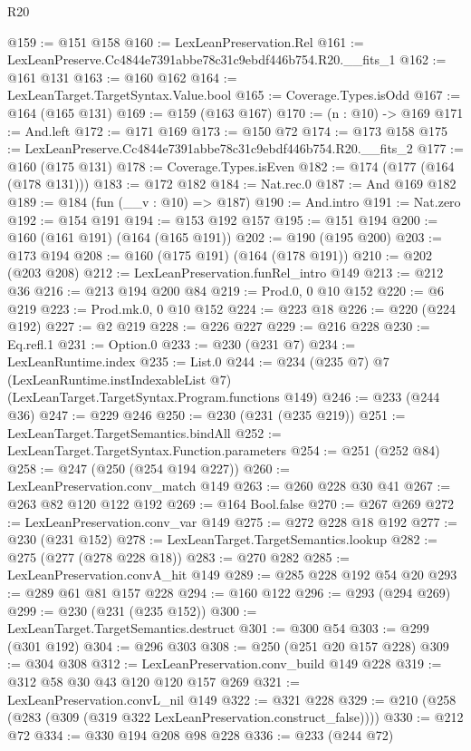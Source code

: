 \begin{lexlean}{R20}
\begin{coremodule}
@159 := @151 @158
@160 := LexLeanPreservation.Rel
@161 := LexLeanPreserve.Cc4844e7391abbe78c31c9ebdf446b754.R20.__fits_1
@162 := @161 @131
@163 := @160 @162
@164 := LexLeanTarget.TargetSyntax.Value.bool
@165 := Coverage.Types.isOdd
@167 := @164 (@165 @131)
@169 := @159 (@163 @167)
@170 := (n : @10) -> @169
@171 := And.left
@172 := @171 @169
@173 := @150 @72
@174 := @173 @158
@175 := LexLeanPreserve.Cc4844e7391abbe78c31c9ebdf446b754.R20.__fits_2
@177 := @160 (@175 @131)
@178 := Coverage.Types.isEven
@182 := @174 (@177 (@164 (@178 @131)))
@183 := @172 @182
@184 := Nat.rec.{0}
@187 := And @169 @182
@189 := @184 (fun (__v : @10) => @187)
@190 := And.intro
@191 := Nat.zero
@192 := @154 @191
@194 := @153 @192 @157
@195 := @151 @194
@200 := @160 (@161 @191) (@164 (@165 @191))
@202 := @190 (@195 @200)
@203 := @173 @194
@208 := @160 (@175 @191) (@164 (@178 @191))
@210 := @202 (@203 @208)
@212 := LexLeanPreservation.funRel_intro @149
@213 := @212 @36
@216 := @213 @194 @200 @84
@219 := Prod.{0, 0} @10 @152
@220 := @6 @219
@223 := Prod.mk.{0, 0} @10 @152
@224 := @223 @18
@226 := @220 (@224 @192)
@227 := @2 @219
@228 := @226 @227
@229 := @216 @228
@230 := Eq.refl.{1}
@231 := Option.{0}
@233 := @230 (@231 @7)
@234 := LexLeanRuntime.index
@235 := List.{0}
@244 := @234
    (@235 @7)
    @7
    (LexLeanRuntime.instIndexableList @7)
    (LexLeanTarget.TargetSyntax.Program.functions @149)
@246 := @233 (@244 @36)
@247 := @229 @246
@250 := @230 (@231 (@235 @219))
@251 := LexLeanTarget.TargetSemantics.bindAll
@252 := LexLeanTarget.TargetSyntax.Function.parameters
@254 := @251 (@252 @84)
@258 := @247 (@250 (@254 @194 @227))
@260 := LexLeanPreservation.conv_match @149
@263 := @260 @228 @30 @41
@267 := @263 @82 @120 @122 @192
@269 := @164 Bool.false
@270 := @267 @269
@272 := LexLeanPreservation.conv_var @149
@275 := @272 @228 @18 @192
@277 := @230 (@231 @152)
@278 := LexLeanTarget.TargetSemantics.lookup
@282 := @275 (@277 (@278 @228 @18))
@283 := @270 @282
@285 := LexLeanPreservation.convA_hit @149
@289 := @285 @228 @192 @54 @20
@293 := @289 @61 @81 @157 @228
@294 := @160 @122
@296 := @293 (@294 @269)
@299 := @230 (@231 (@235 @152))
@300 := LexLeanTarget.TargetSemantics.destruct
@301 := @300 @54
@303 := @299 (@301 @192)
@304 := @296 @303
@308 := @250 (@251 @20 @157 @228)
@309 := @304 @308
@312 := LexLeanPreservation.conv_build @149 @228
@319 := @312 @58 @30 @43 @120 @120 @157 @269
@321 := LexLeanPreservation.convL_nil @149
@322 := @321 @228
@329 := @210 (@258 (@283 (@309 (@319 @322 LexLeanPreservation.construct_false))))
@330 := @212 @72
@334 := @330 @194 @208 @98 @228
@336 := @233 (@244 @72)

\end{coremodule}
\end{lexlean}
